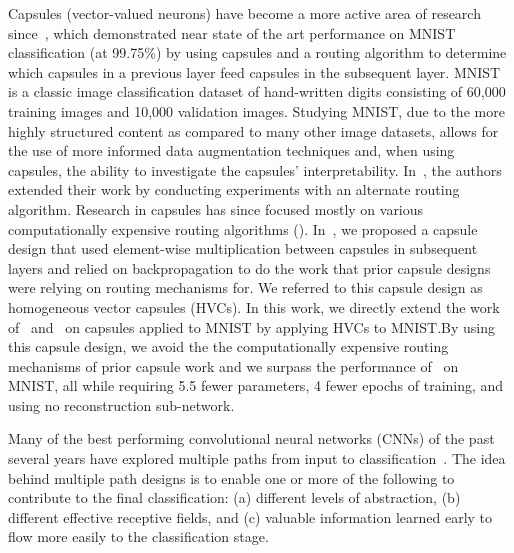 \documentclass{article}
\begin{document}
Capsules (vector-valued neurons) have become a more active area of research since~\cite{Sabour2017}, which demonstrated near state of the art performance on MNIST~\cite{Lecun2010} classification (at 99.75\%) by using capsules and a routing algorithm to determine which capsules in a previous layer feed capsules in the subsequent layer.  MNIST is a classic image classification dataset of hand-written digits consisting of 60,000 training images and 10,000 validation images.  Studying MNIST, due to the more highly structured content as compared to many other image datasets, allows for the use of more informed data augmentation techniques and, when using capsules, the ability to investigate the capsules' interpretability.  In~\cite{Hinton2018}, the authors extended their work by conducting experiments with an alternate routing algorithm.  Research in capsules has since focused mostly on various computationally expensive routing algorithms (\cite{Venkataraman2020}\cite{Amer2020}).  In~\cite{Byerly2019}, we proposed a capsule design that used element-wise multiplication between capsules in subsequent layers and relied on backpropagation to do the work that prior capsule designs were relying on routing mechanisms for.  We referred to this capsule design as homogeneous vector capsules (HVCs).  In this work, we directly extend the work of~\cite{Hinton2011} and~\cite{Sabour2017} on capsules applied to MNIST by applying HVCs to MNIST.\@ By using this capsule design, we avoid the the computationally expensive routing mechanisms of prior capsule work and we surpass the performance of~\cite{Sabour2017} on MNIST, all while requiring 5.5 fewer parameters, 4 fewer epochs of training, and using no reconstruction sub-network.

Many of the best performing convolutional neural networks (CNNs) of the past several years have explored multiple paths from input to classification~\cite{Szegedy2015a}\cite{Szegedy2015b}\cite{He2015}\cite{Zhou2020}\cite{Wang2020}\cite{Ciresan2012}.  The idea behind multiple path designs is to enable one or more of the following to contribute to the final classification: (a) different levels of abstraction, (b) different effective receptive fields, and (c) valuable information learned early to flow more easily to the classification stage.
\end{document}
